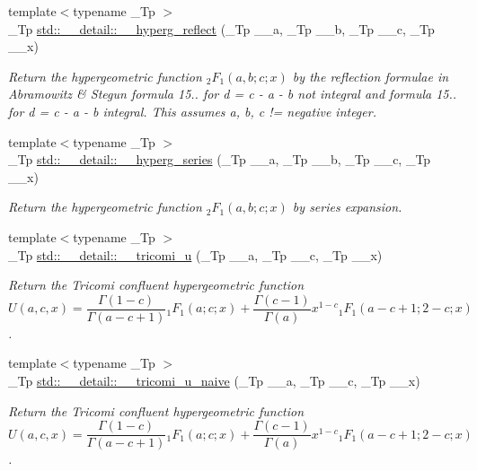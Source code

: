 \begin{DoxyCompactItemize}
{\footnotesize template$<$typename \+\_\+\+Tp $>$ }\\\+\_\+\+Tp \hyperlink{namespacestd_1_1____detail_a3c3baddc93bfaf1cb368d4b74e53542d}{std\+::\+\_\+\+\_\+detail\+::\+\_\+\+\_\+hyperg\+\_\+reflect} (\+\_\+\+Tp \+\_\+\+\_\+a, \+\_\+\+Tp \+\_\+\+\_\+b, \+\_\+\+Tp \+\_\+\+\_\+c, \+\_\+\+Tp \+\_\+\+\_\+x)
\begin{DoxyCompactList}\small\item\em Return the hypergeometric function $ {}_2F_1(a,b;c;x) $ by the reflection formulae in Abramowitz \& Stegun formula 15.. for d = c -\/ a -\/ b not integral and formula 15.. for d = c -\/ a -\/ b integral. This assumes a, b, c != negative integer. \end{DoxyCompactList}\item 
{\footnotesize template$<$typename \+\_\+\+Tp $>$ }\\\+\_\+\+Tp \hyperlink{namespacestd_1_1____detail_ad234e0d31f55cd3748169dccb2533c6a}{std\+::\+\_\+\+\_\+detail\+::\+\_\+\+\_\+hyperg\+\_\+series} (\+\_\+\+Tp \+\_\+\+\_\+a, \+\_\+\+Tp \+\_\+\+\_\+b, \+\_\+\+Tp \+\_\+\+\_\+c, \+\_\+\+Tp \+\_\+\+\_\+x)
\begin{DoxyCompactList}\small\item\em Return the hypergeometric function $ {}_2F_1(a,b;c;x) $ by series expansion. \end{DoxyCompactList}\item 
{\footnotesize template$<$typename \+\_\+\+Tp $>$ }\\\+\_\+\+Tp \hyperlink{namespacestd_1_1____detail_ae67133e463041158ebbffe6c54af6e0a}{std\+::\+\_\+\+\_\+detail\+::\+\_\+\+\_\+tricomi\+\_\+u} (\+\_\+\+Tp \+\_\+\+\_\+a, \+\_\+\+Tp \+\_\+\+\_\+c, \+\_\+\+Tp \+\_\+\+\_\+x)
\begin{DoxyCompactList}\small\item\em Return the Tricomi confluent hypergeometric function \[ U(a,c,x) = \frac{\Gamma(1-c)}{\Gamma(a-c+1)} {}_1F_1(a;c;x) + \frac{\Gamma(c-1)}{\Gamma(a)} x^{1-c} {}_1F_1(a-c+1;2-c;x) \]. \end{DoxyCompactList}\item 
{\footnotesize template$<$typename \+\_\+\+Tp $>$ }\\\+\_\+\+Tp \hyperlink{namespacestd_1_1____detail_adc131cec2eae93bacc28d6afd89def2f}{std\+::\+\_\+\+\_\+detail\+::\+\_\+\+\_\+tricomi\+\_\+u\+\_\+naive} (\+\_\+\+Tp \+\_\+\+\_\+a, \+\_\+\+Tp \+\_\+\+\_\+c, \+\_\+\+Tp \+\_\+\+\_\+x)
\begin{DoxyCompactList}\small\item\em Return the Tricomi confluent hypergeometric function \[ U(a,c,x) = \frac{\Gamma(1-c)}{\Gamma(a-c+1)} {}_1F_1(a;c;x) + \frac{\Gamma(c-1)}{\Gamma(a)} x^{1-c} {}_1F_1(a-c+1;2-c;x) \]. \end{DoxyCompactList}\end{DoxyCompactItemize}


